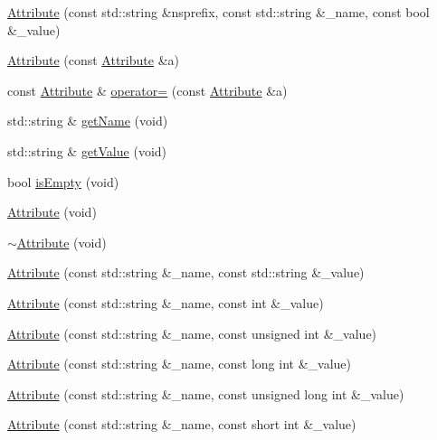\begin{DoxyCompactItemize}
\mbox{\hyperlink{classXMLWriterAPI_1_1Attribute_ac570bd81cf851adca96d3b28eaa58c3e}{Attribute}} (const std\+::string \&nsprefix, const std\+::string \&\+\_\+name, const bool \&\+\_\+value)
\item 
\mbox{\hyperlink{classXMLWriterAPI_1_1Attribute_aca912ec438af7f63c2ac1f5c37dafbaa}{Attribute}} (const \mbox{\hyperlink{classXMLWriterAPI_1_1Attribute}{Attribute}} \&a)
\item 
const \mbox{\hyperlink{classXMLWriterAPI_1_1Attribute}{Attribute}} \& \mbox{\hyperlink{classXMLWriterAPI_1_1Attribute_a66481b41867b83a48b65a63165a7bcd9}{operator=}} (const \mbox{\hyperlink{classXMLWriterAPI_1_1Attribute}{Attribute}} \&a)
\item 
std\+::string \& \mbox{\hyperlink{classXMLWriterAPI_1_1Attribute_aa8e93695d2ca543f088b775278e84351}{get\+Name}} (void)
\item 
std\+::string \& \mbox{\hyperlink{classXMLWriterAPI_1_1Attribute_afffa6cf6728f7c91f5cb48d59677d307}{get\+Value}} (void)
\item 
bool \mbox{\hyperlink{classXMLWriterAPI_1_1Attribute_abb2578da0df10262895c632b7e83e7ba}{is\+Empty}} (void)
\item 
\mbox{\hyperlink{classXMLWriterAPI_1_1Attribute_a8e3ae0b3a50638884297229bbeea63a5}{Attribute}} (void)
\item 
\mbox{\hyperlink{classXMLWriterAPI_1_1Attribute_a0f46ffe1b2c523fab17e567825dd3ec3}{$\sim$\+Attribute}} (void)
\item 
\mbox{\hyperlink{classXMLWriterAPI_1_1Attribute_a0eb808fb230ba6a40ac9ee5334e86244}{Attribute}} (const std\+::string \&\+\_\+name, const std\+::string \&\+\_\+value)
\item 
\mbox{\hyperlink{classXMLWriterAPI_1_1Attribute_a4ea20cb88234ac7eb3aedc6971d7c649}{Attribute}} (const std\+::string \&\+\_\+name, const int \&\+\_\+value)
\item 
\mbox{\hyperlink{classXMLWriterAPI_1_1Attribute_ac147b4b673ad76a63fa60b5fba30ca24}{Attribute}} (const std\+::string \&\+\_\+name, const unsigned int \&\+\_\+value)
\item 
\mbox{\hyperlink{classXMLWriterAPI_1_1Attribute_a2ed766103f87670031137dc458d55f7b}{Attribute}} (const std\+::string \&\+\_\+name, const long int \&\+\_\+value)
\item 
\mbox{\hyperlink{classXMLWriterAPI_1_1Attribute_a4b58b92ec04b16aaeb474b481fc82f75}{Attribute}} (const std\+::string \&\+\_\+name, const unsigned long int \&\+\_\+value)
\item 
\mbox{\hyperlink{classXMLWriterAPI_1_1Attribute_a2a3505111016bd8236b31fd0fbd720ae}{Attribute}} (const std\+::string \&\+\_\+name, const short int \&\+\_\+value)

\end{DoxyCompactItemize}

